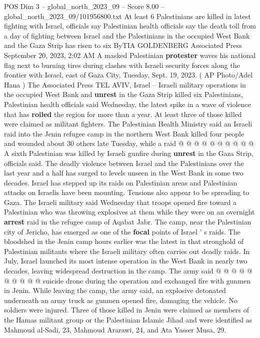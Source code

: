 \begin{textsample}{POS Dim 3 – global\_north\_2023\_09 – Score 8.00 – global\_north\_2023\_09/101956800.txt}  \label{ex:f3_pos_061}
At least 6 Palestinians are killed in latest fighting with Israel, officials say Palestinian health officials say the death toll from a day of fighting between Israel and the Palestinians in the occupied West Bank and the Gaza Strip has risen to six ByTIA GOLDENBERG Associated Press September 20, 2023, 2:02 AM A masked Palestinian \textbf{protester} waves his national flag next to burning tires during clashes with Israeli security forces along the frontier with Israel, east of Gaza City, Tuesday, Sept. 19, 2023. ( AP Photo/Adel Hana ) The Associated Press TEL AVIV, Israel -- Israeli military operations in the occupied West Bank and \textbf{unrest} in the Gaza Strip killed six Palestinians, Palestinian health officials said Wednesday, the latest spike in a wave of violence that has \textbf{roiled} the region for more than a year.
At least three of those killed were claimed as militant fighters.
The Palestinian Health Ministry said an Israeli raid into the Jenin refugee camp in the northern West Bank killed four people and wounded about 30 others late Tuesday, while a raid @ @ @ @ @ @ @ @ @ @ A sixth Palestinian was killed by Israeli gunfire during \textbf{unrest} in the Gaza Strip, officials said.
The deadly violence between Israel and the Palestinians over the last year and a half has surged to levels unseen in the West Bank in some two decades.
Israel has stepped up its raids on Palestinian areas and Palestinian attacks on Israelis have been mounting.
Tensions also appear to be spreading to Gaza.
The Israeli military said Wednesday that troops opened fire toward a Palestinian who was throwing explosives at them while they were on an overnight \textbf{arrest} raid in the refugee camp of Aqabat Jabr.
The camp, near the Palestinian city of Jericho, has emerged as one of the \textbf{focal} points of Israel ' s raids.
The bloodshed in the Jenin camp hours earlier was the latest in that stronghold of Palestinian militants where the Israeli military often carries out deadly raids.
In July, Israel launched its most intense operation in the West Bank in nearly two decades, leaving widespread destruction in the camp.
The army said @ @ @ @ @ @ @ @ @ @ suicide drone during the operation and exchanged fire with gunmen in Jenin.
While leaving the camp, the army said, an explosive detonated underneath an army truck as gunmen opened fire, damaging the vehicle.
No soldiers were injured.
Three of those killed in Jenin were claimed as members of the Hamas militant group or the Palestinian Islamic Jihad and were identified as Mahmoud al-Sadi, 23, Mahmoud Ararawi, 24, and Ata Yasser Musa, 29.

\end{textsample}
